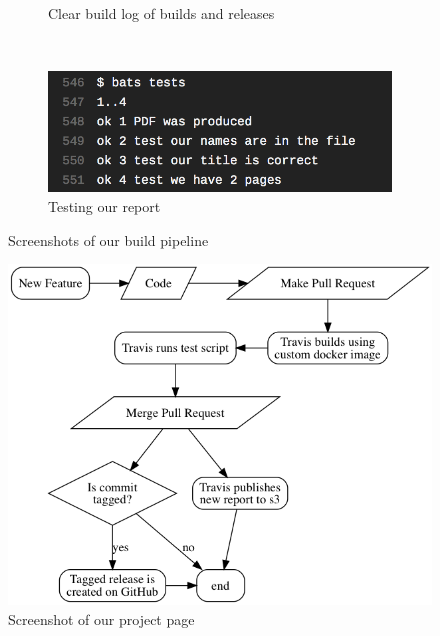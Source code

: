 \begin{figure}[ht]
\begin{subfigure}[h]{0.4\linewidth}
    \caption{Clear build log of builds and releases}
    \label{fig:ci-4}
  \end{subfigure}
  \\
  \begin{subfigure}[h]{0.4\linewidth}
    \centering
    \includegraphics[width=\linewidth]{ci-5.png}
    \caption{Testing our report}
    \label{fig:ci-5}
  \end{subfigure}
  \caption{Screenshots of our build pipeline}
  \label{fig:}
\end{figure}

\begin{figure}[ht]
  \centering
  \includegraphics[width=0.5\linewidth]{flowchart.png}
  \caption{Screenshot of our project page}
  \label{fig:}
\end{figure}
